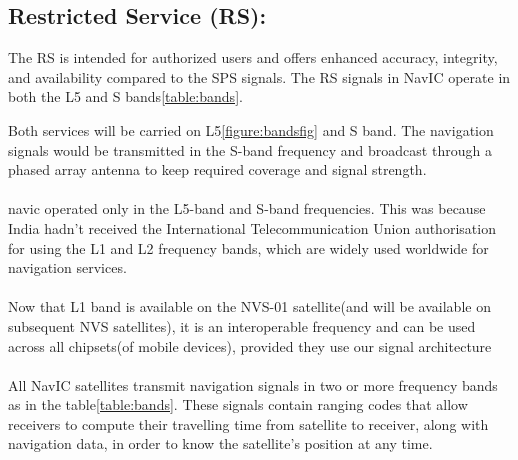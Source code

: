 \subsection{Restricted Service (RS):}
The RS is intended for authorized users and offers enhanced accuracy, integrity, and availability compared to the SPS signals. The RS signals in NavIC operate in both the L5 and S bands\ref{table:bands}.	

	
Both services will be carried on L5\ref{figure:bandsfig} and S band. The navigation signals would be transmitted in the S-band frequency and broadcast through a phased array antenna to keep required coverage and signal strength.
\\
\\
navic operated only in the L5-band and S-band frequencies. This was because India hadn't received the International Telecommunication Union authorisation for using the L1 and L2 frequency bands, which are widely used worldwide for navigation services.
\\
\\
Now that L1 band is available on the NVS-01 satellite(and will be available on subsequent NVS satellites), it is an interoperable frequency and can be used across all chipsets(of mobile devices), provided they use our signal architecture
\\
\\
All NavIC satellites transmit navigation signals in two or more frequency bands as in the table\ref{table:bands}. These signals contain ranging codes that allow receivers to compute their travelling time from satellite to receiver, along with navigation data, in order to know the satellite’s position at any time. 
%
